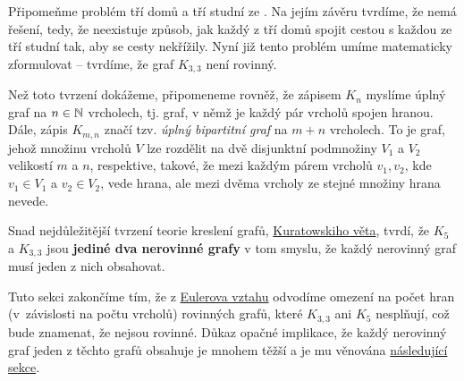 Připomeňme problém tří domů a tří studní ze
. Na jejím závěru tvrdíme, že
nemá řešení, tedy, že neexistuje způsob, jak každý z tří domů spojit cestou s
každou ze tří studní tak, aby se cesty nekřížily. Nyní již tento problém umíme
matematicky zformulovat -- tvrdíme, že graf $K_{3,3}$ není rovinný.

Než toto tvrzení dokážeme, připomeneme rovněž, že zápisem $K_n$ myslíme úplný
graf na $n \in \mathbb{N}$ vrcholech, tj. graf, v němž je každý pár vrcholů spojen
hranou. Dále, zápis $K_{m,n}$ značí tzv. \emph{úplný bipartitní graf} na $m + n$
vrcholech. To je graf, jehož množinu vrcholů $V$ lze rozdělit na dvě disjunktní
podmnožiny $V_1$ a $V_2$ velikostí $m$ a $n$, respektive, takové, že mezi každým
párem vrcholů $v_1,v_2$, kde $v_1 \in V_1$ a $v_2 \in V_2$, vede hrana, ale mezi
dvěma vrcholy ze stejné množiny hrana nevede.

Snad nejdůležitější tvrzení teorie kreslení grafů,
\hyperref[thm:kuratowskiho]{Kuratowskiho věta}, tvrdí, že $K_5$ a $K_{3,3}$ jsou
\textbf{jediné dva nerovinné grafy} v tom smyslu, že každý nerovinný graf musí
jeden z nich obsahovat.

Tuto sekci zakončíme tím, že z \hyperref[claim:euleruv-vztah]{Eulerova vztahu}
odvodíme omezení na počet hran (v~závislosti na počtu vrcholů) rovinných grafů,
které $K_{3,3}$ ani $K_5$ nesplňují, což bude znamenat, že nejsou rovinné. Důkaz
opačné implikace, že každý nerovinný graf jeden z těchto grafů obsahuje je
mnohem těžší a je mu věnována \hyperref[sssec:kuratowskiho-veta]{následující
sekce}.

